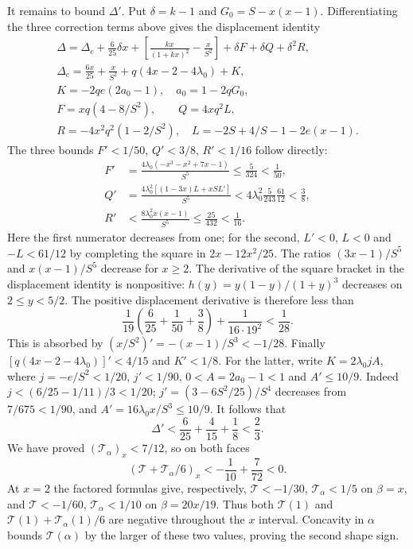 It remains to bound $\Delta'$. Put $\delta=k-1$ and $G_0=S-x(x-1)$.
Differentiating the three correction terms above gives the displacement identity
\begin{gather*}
 \Delta=\Delta_c+\frac6{25}\delta x
       +\left[\frac{kx}{(1+kx)^2}-\frac{x}{S^2}\right]
       +\delta F+\delta Q+\delta^2R,\\
 \Delta_c=\frac{6x}{25}+\frac{x}{S^2}+q(4x-2-4\lambda_0)+K,\\
 K=-2qe(2a_0-1),\quad a_0=1-2qG_0,\\
 F=xq(4-8/S^2),\qquad Q=4xq^2L,\\
 R=-4x^2q^2(1-2/S^2),\quad L=-2S+4/S-1-2e(x-1).
\end{gather*}
The three bounds $F'<1/50$, $Q'<3/8$, $R'<1/16$ follow directly:
\begin{align*}
 F'&=\frac{4\lambda_0(-x^3-x^2+7x-1)}{S^5}\le\frac5{324}<\frac1{50},\\
 Q'&=\frac{4\lambda_0^2[(1-3x)L+xSL']}{S^5}
       <4\lambda_0^2\frac5{243}\frac{61}{12}<\frac38,\\
 R'&<\frac{8\lambda_0^2x(x-1)}{S^5}\le\frac{25}{432}<\frac1{16}.
\end{align*}
Here the first numerator decreases from one; for the second, $L'<0$, $L<0$ and
$-L<61/12$ by completing the square in $2x-12x^2/25$.
The ratios $(3x-1)/S^5$ and $x(x-1)/S^5$ decrease for $x\ge2$.
The derivative of the square bracket in the displacement identity is nonpositive:
$h(y)=y(1-y)/(1+y)^3$ decreases on $2\le y<5/2$.
The positive displacement derivative is therefore less than
\[
 \frac1{19}\left(\frac6{25}+\frac1{50}+\frac38\right)
       +\frac1{16\cdot19^2}<\frac1{28}.
\]
This is absorbed by $(x/S^2)'=-(x-1)/S^3<-1/28$.
Finally $[q(4x-2-4\lambda_0)]'<4/15$ and $K'<1/8$.
For the latter, write $K=2\lambda_0jA$, where
$j=-e/S^2<1/20$, $j'<1/90$, $0<A=2a_0-1<1$ and $A'\le10/9$.
Indeed $j<(6/25-1/11)/3<1/20$; $j'=(3-6S^2/25)/S^4$ decreases from $7/675<1/90$,
and $A'=16\lambda_0x/S^3\le10/9$.
It follows that
\[
 \Delta'<\frac6{25}+\frac4{15}+\frac18<\frac23.
\]
We have proved $(\mathcal T_\alpha)_x<7/12$, so on both faces
\[
 (\mathcal T+\mathcal T_\alpha/6)_x<-\frac1{10}+\frac7{72}<0.
\]
At $x=2$ the factored formulas give, respectively,
$\mathcal T<-1/30$, $\mathcal T_\alpha<1/5$ on $\beta=x$, and
$\mathcal T<-1/60$, $\mathcal T_\alpha<1/10$ on $\beta=20x/19$.
Thus both $\mathcal T(1)$ and $\mathcal T(1)+\mathcal T_\alpha(1)/6$ are negative
throughout the $x$ interval. Concavity in $\alpha$ bounds $\mathcal T(\alpha)$ by the
larger of these two values, proving the second shape sign.

